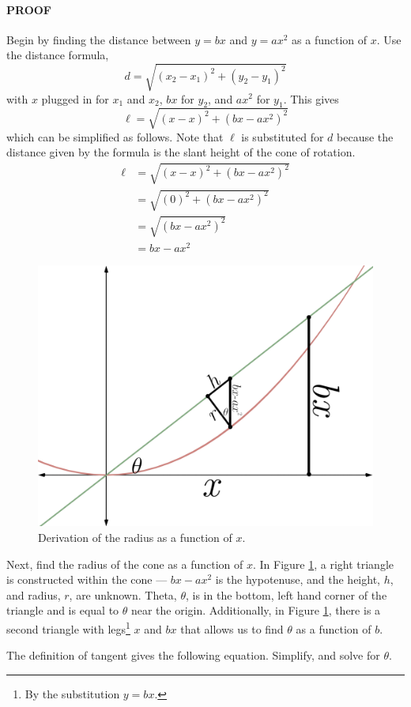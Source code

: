 \documentclass{article}
\begin{document}
\paragraph{PROOF} Begin by finding the distance between $y=bx$ and $y=ax^2$ as a function of $x$. Use the distance formula,$$d=\sqrt{\left(x_2-x_1\right)^2+\left(y_2-y_1\right)^2}$$with $x$ plugged in for $x_1$ and $x_2$, $bx$ for $y_2$, and $ax^2$ for $y_1$. This gives$$\ell=\sqrt{\left(x-x\right)^2+\left(bx-ax^2\right)^2}$$ which can be simplified as follows. Note that $\ell$ is substituted for $d$ because the distance given by the formula is the slant height of the cone of rotation.
\begin{align*}
\ell &=\sqrt{\left(x-x\right)^2+\left(bx-ax^2\right)^2}\\
      &=\sqrt{\left(0\right)^2+\left(bx-ax^2\right)^2}\\
      &=\sqrt{\left(bx-ax^2\right)^2}\\
      &=bx-ax^2\tag{1}
\end{align*}\par
\begin{figure}[t]
  \centering
  \includegraphics[width=0.6\linewidth]{Blender/ParabolaLineIntegration-ConeTriangles-f2_0001.png}
  \caption{Derivation of the radius as a function of $x$.}
  \label{fig:cone2}
\end{figure}
Next, find the radius of the cone as a function of $x$. In Figure \ref{fig:cone2}, a right triangle is constructed within the cone --- $bx-ax^2$ is the hypotenuse, and the height, $h$, and radius, $r$, are unknown. Theta, $\theta$, is in the bottom, left hand corner of the triangle and is equal to $\theta$ near the origin. Additionally, in Figure \ref{fig:cone2}, there is a second triangle with legs\footnote{By the substitution $y=bx$.} $x$ and $bx$ that allows us to find $\theta$ as a function of $b$.\par
The definition of tangent gives the following equation. Simplify, and solve for $\theta$.
\end{document}
